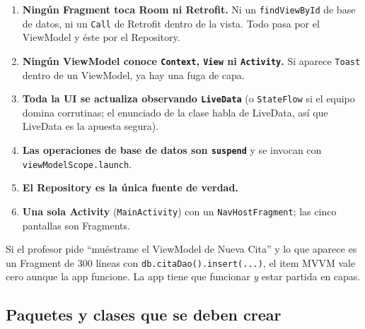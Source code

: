 \documentclass[11pt,letterpaper]{article}
\newcommand{\code}[1]{\texttt{\small #1}}
\begin{document}
\begin{enumerate}[leftmargin=1.6em,itemsep=3pt]
  \item \textbf{Ning\'un Fragment toca Room ni Retrofit.} Ni un \code{findViewById}
        de base de datos, ni un \code{Call} de Retrofit dentro de la vista. Todo
        pasa por el ViewModel y \'este por el Repository.
  \item \textbf{Ning\'un ViewModel conoce \code{Context}, \code{View} ni
        \code{Activity}.} Si aparece \code{Toast} dentro de un ViewModel, ya hay
        una fuga de capa.
  \item \textbf{Toda la UI se actualiza observando \code{LiveData}} (o
        \code{StateFlow} si el equipo domina corrutinas; el enunciado de la clase
        habla de LiveData, as\'i que LiveData es la apuesta segura).
  \item \textbf{Las operaciones de base de datos son \code{suspend}} y se invocan
        con \code{viewModelScope.\allowbreak{}launch}.
  \item \textbf{El Repository es la \'unica fuente de verdad.}
  \item \textbf{Una sola Activity} (\code{MainActivity}) con un
        \code{NavHostFragment}; las cinco pantallas son Fragments.
\end{enumerate}

\begin{notabox}
Si el profesor pide ``mu\'estrame el ViewModel de Nueva Cita'' y lo que aparece es
un Fragment de 300 l\'ineas con \code{db.citaDao(\allowbreak{}).insert(\allowbreak{}...)}, el item MVVM
vale cero aunque la app funcione. La app tiene que funcionar \emph{y} estar
partida en capas.
\end{notabox}

\newpage

\subsection{Paquetes y clases que se deben crear}
\end{document}
